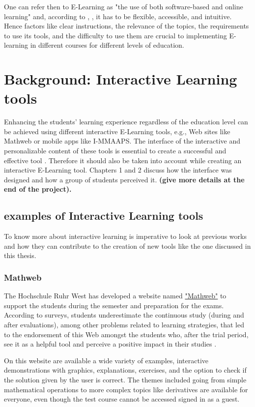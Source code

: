 One can refer then to E-Learning as "the use of both software-based and online learning"  \cite{tabak} and, according to \cite{tabak}, \cite{munoz}, it has to be flexible, accessible, and intuitive. Hence factors like clear instructions, the relevance of the topics, the requirements to use its tools, and the difficulty to use them are crucial to implementing E-learning in different courses for different levels of education.

\section{Background: Interactive Learning tools}

Enhancing the students' learning experience regardless of the education level can be achieved using different interactive E-Learning tools, e.g., Web sites like Mathweb or mobile apps like I-MMAAPS. The interface of the interactive and personalizable content of these tools is essential to create a successful and effective tool \cite{vltool}. Therefore it should also be taken into account while creating an interactive E-Learning tool. Chapters 1 and 2 discuss how the interface was designed  and how a group of students perceived it.\textbf{ (give more details at the end of the project). }



\subsection{examples of Interactive Learning tools}
To know more about interactive learning is imperative to look at previous works and how they can contribute to the creation of new tools like the one discussed in this thesis.

\subsubsection{Mathweb}
The Hochschule Ruhr West has developed a website named \href{https://mathweb.de/}{"Mathweb"}   to support the students during the semester and preparation for the exams. According to surveys,  students underestimate the continuous study (during and after evaluations), among other problems related to learning strategies, that led to the endorsement of this Web amongst the students who, after the trial period, see it as a helpful tool and perceive a positive impact in their studies \cite{MathWeb}.

On this website are available a wide variety of examples, interactive demonstrations with graphics, explanations, exercises, and the option to check if the solution given by the user is correct. The themes included going from simple mathematical operations to more complex topics like derivatives are available for everyone, even though the test course cannot be accessed signed in as a guest.

